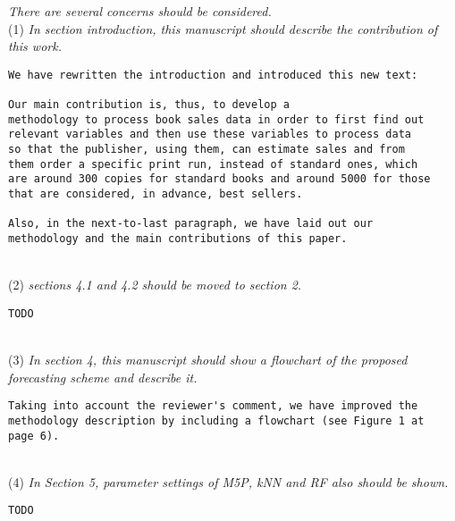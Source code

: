 \documentclass[preprint]{elsarticle}
\begin{document}
\noindent \emph{There are several concerns should be considered. } \\


\noindent (1) \emph{In section introduction, this manuscript should describe the contribution of this work. } 

\begin{verbatim}
We have rewritten the introduction and introduced this new text:

Our main contribution is, thus, to develop a
methodology to process book sales data in order to first find out
relevant variables and then use these variables to process data 
so that the publisher, using them, can estimate sales and from 
them order a specific print run, instead of standard ones, which 
are around 300 copies for standard books and around 5000 for those 
that are considered, in advance, best sellers.

Also, in the next-to-last paragraph, we have laid out our 
methodology and the main contributions of this paper.
\end{verbatim}

~\\
\noindent (2) \emph{sections 4.1 and 4.2 should be moved to section 2. } 

\begin{verbatim}
TODO
\end{verbatim}

~\\
\noindent (3) \emph{In section 4, this manuscript should show a flowchart of the proposed forecasting scheme and describe it. } 

\begin{verbatim}
Taking into account the reviewer's comment, we have improved the 
methodology description by including a flowchart (see Figure 1 at 
page 6).
\end{verbatim}

~\\
\noindent (4) \emph{In Section 5, parameter settings of M5P, kNN and RF also should be shown. } 

\begin{verbatim}
TODO
\end{verbatim}
\end{document}
